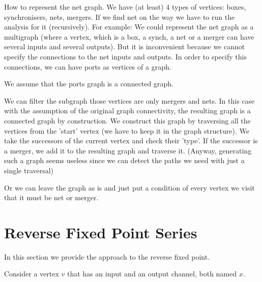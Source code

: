 How to represent the net graph.
We have (at least) 4 types of vertices: boxes, synchronisers, nets, mergers.
If we find net on the way we have to run the analysis for it (recursively). For example:
%
We could represent the net graph as a multigraph (where a vertex, which is a box, a synch, a net or a merger can have several inputs and several outputs).
But it is inconvenient because we cannot specify the connections to the net inputs and outputs. In order to specify this connections, we can have ports as vertices of a graph.

We assume that the ports graph is a connected graph.

We can filter the subgraph those vertices are only mergers and nets. In this case with the assumption of the original graph connectivity, the resulting graph is a connected graph by construction.
We construct this graph by traversing all the vertices from the 'start' vertex (we have to keep it in the graph structure). We take the successors of the current vertex and check their 'type'. If the successor is a merger, we add it to the resulting graph and traverse it. (Anyway, generating such a graph seems useless since we can detect the paths we need with just a single traversal)

Or we can leave the graph as is and just put a condition of every vertex we visit that it must be net or merger.



    \section{Reverse Fixed Point Series\label{rfp}}
In this section we provide the approach to the reverse fixed point.

Consider a vertex $v$ that has an input and an output channel, both named $x$.

